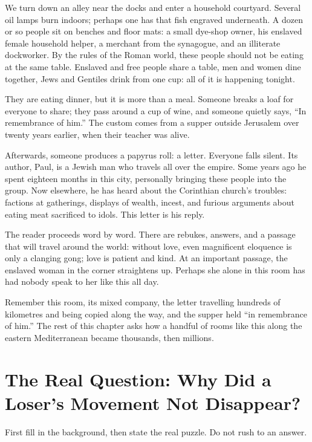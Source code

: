 We turn down an alley near the docks and enter a household courtyard. Several oil lamps burn indoors; perhaps one has that fish engraved underneath. A dozen or so people sit on benches and floor mats: a small dye-shop owner, his enslaved female household helper, a merchant from the synagogue, and an illiterate dockworker. By the rules of the Roman world, these people should not be eating at the same table. Enslaved and free people share a table, men and women dine together, Jews and Gentiles drink from one cup: all of it is happening tonight.

They are eating dinner, but it is more than a meal. Someone breaks a loaf for everyone to share; they pass around a cup of wine, and someone quietly says, ``In remembrance of him.'' The custom comes from a supper outside Jerusalem over twenty years earlier, when their teacher was alive.

Afterwards, someone produces a papyrus roll: a letter. Everyone falls silent. Its author, Paul, is a Jewish man who travels all over the empire. Some years ago he spent eighteen months in this city, personally bringing these people into the group. Now elsewhere, he has heard about the Corinthian church's troubles: factions at gatherings, displays of wealth, incest, and furious arguments about eating meat sacrificed to idols. This letter is his reply.

The reader proceeds word by word. There are rebukes, answers, and a passage that will travel around the world: without love, even magnificent eloquence is only a clanging gong; love is patient and kind. At an important passage, the enslaved woman in the corner straightens up. Perhaps she alone in this room has had nobody speak to her like this all day.

Remember this room, its mixed company, the letter travelling hundreds of kilometres and being copied along the way, and the supper held ``in remembrance of him.'' The rest of this chapter asks how a handful of rooms like this along the eastern Mediterranean became thousands, then millions.

\section[Why Did This Failed Movement Survive?]{The Real Question: Why Did a Loser's Movement Not Disappear?}
First fill in the background, then state the real puzzle. Do not rush to an answer.

